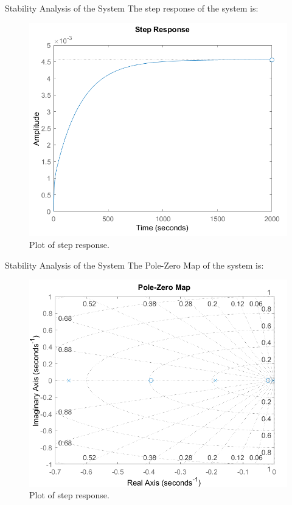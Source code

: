 \documentclass[10pt,compress,mathserif]{beamer}
\begin{document}
\begin{frame}{Stability Analysis of the System}
	The step response of the system is:
	\begin{figure}[h!]
		\centering
		\includegraphics[scale=0.65]{images/stepResponse.png}
		\caption{Plot of step response.}
	\end{figure}
\end{frame}

\begin{frame}{Stability Analysis of the System}
	The Pole-Zero Map of the system is:
	\begin{figure}[h!]
		\centering
		\includegraphics[scale=0.65]{images/poleZeroMap.png}
		\caption{Plot of step response.}
	\end{figure}
\end{frame}
\end{document}
